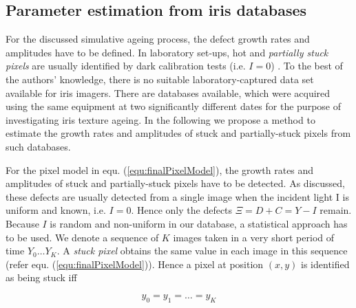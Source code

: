 \documentclass[10pt,twocolumn,letterpaper]{article}
\begin{document}
 
 
 
 \subsection{Parameter estimation from iris databases}
 \label{hotPixelRate}
 For the discussed simulative ageing process, the defect growth rates and amplitudes have to be defined. In laboratory set-ups, hot and \emph{partially stuck pixels} are usually identified by dark calibration tests (i.e. $I=0$) \cite{defectIdentification}. To the best of the authors' knowledge, there is no suitable laboratory-captured data set available for iris imagers. There are databases \cite{czajkaTemplateAging,fenkerIrisAging} available, which were acquired using the same equipment at two significantly different dates for the purpose of investigating iris texture ageing. In the following we propose a method to estimate the growth rates and amplitudes of stuck and partially-stuck  pixels from such databases. 
 
For the pixel model in equ. (\ref{equ:finalPixelModel}), the growth rates and amplitudes of stuck and partially-stuck pixels have to be detected. As discussed, these defects are usually detected from a single image when the incident light I is uniform and known, i.e. $I=0$. Hence only the defects $\Xi = D+C = Y-I$ remain. Because $I$ is random and non-uniform in our database, a statistical approach has to be used.
We denote a sequence of $K$ images taken in a very short period of time $Y_0 \dots Y_K$. 
A \emph{stuck pixel} obtains the same value in each image in this sequence (refer equ. (\ref{equ:finalPixelModel})). Hence a pixel at position $(x,y)$ is identified as being stuck iff

\begin{equation}
y_{0} = y_{1} = \dots = y_{K} \label{equ:conditionStuck}
\end{equation}
\end{document}
